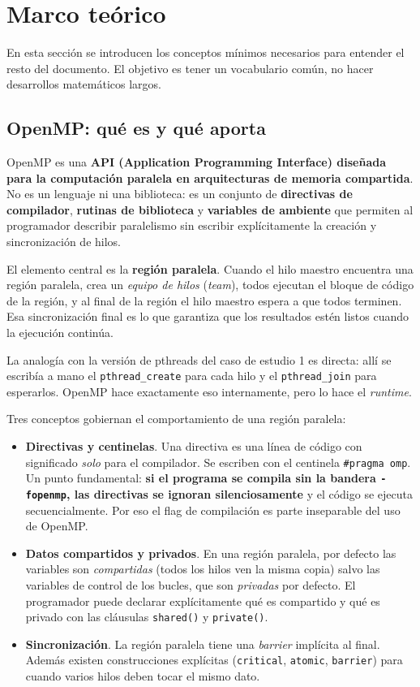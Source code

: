 \section{Marco teórico}

En esta sección se introducen los conceptos mínimos necesarios para entender el resto del documento. El objetivo es tener un vocabulario común, no hacer desarrollos matemáticos largos.

\subsection{OpenMP: qué es y qué aporta}

OpenMP es una \textbf{API (Application Programming Interface) diseñada para la computación paralela en arquitecturas de memoria compartida}. No es un lenguaje ni una biblioteca: es un conjunto de \textbf{directivas de compilador}, \textbf{rutinas de biblioteca} y \textbf{variables de ambiente} que permiten al programador describir paralelismo sin escribir explícitamente la creación y sincronización de hilos.

El elemento central es la \textbf{región paralela}. Cuando el hilo maestro encuentra una región paralela, crea un \textit{equipo de hilos} (\textit{team}), todos ejecutan el bloque de código de la región, y al final de la región el hilo maestro espera a que todos terminen. Esa sincronización final es lo que garantiza que los resultados estén listos cuando la ejecución continúa.

La analogía con la versión de pthreads del caso de estudio 1 es directa: allí se escribía a mano el \texttt{pthread\_create} para cada hilo y el \texttt{pthread\_join} para esperarlos. OpenMP hace exactamente eso internamente, pero lo hace el \textit{runtime}.

Tres conceptos gobiernan el comportamiento de una región paralela:

\begin{itemize}
    \item \textbf{Directivas y centinelas}. Una directiva es una línea de código con significado \emph{solo} para el compilador. Se escriben con el centinela \texttt{\#pragma omp}. Un punto fundamental: \textbf{si el programa se compila sin la bandera \texttt{-fopenmp}, las directivas se ignoran silenciosamente} y el código se ejecuta secuencialmente. Por eso el flag de compilación es parte inseparable del uso de OpenMP.
    \item \textbf{Datos compartidos y privados}. En una región paralela, por defecto las variables son \emph{compartidas} (todos los hilos ven la misma copia) salvo las variables de control de los bucles, que son \emph{privadas} por defecto. El programador puede declarar explícitamente qué es compartido y qué es privado con las cláusulas \texttt{shared()} y \texttt{private()}.
    \item \textbf{Sincronización}. La región paralela tiene una \emph{barrier} implícita al final. Además existen construcciones explícitas (\texttt{critical}, \texttt{atomic}, \texttt{barrier}) para cuando varios hilos deben tocar el mismo dato.
\end{itemize}

